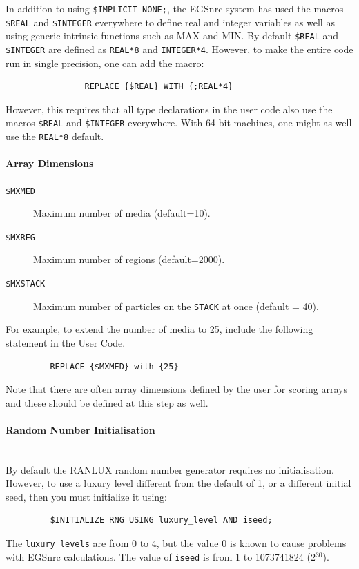 
In addition to using {\tt \$IMPLICIT NONE;}, the EGSnrc system has used
the macros {\tt \$REAL} and {\tt \$INTEGER} everywhere to define real
and integer variables as well as using generic intrinsic functions such
as MAX and MIN.  By default {\tt \$REAL} and {\tt \$INTEGER} are defined
as {\tt REAL*8} and {\tt INTEGER*4}.  However, to make the entire code
run in single precision, one can add the macro:
\begin{verbatim}
                REPLACE {$REAL} WITH {;REAL*4}
\end{verbatim}
However, this requires that all type declarations in the user code also use
the macros {\tt \$REAL} and {\tt \$INTEGER} everywhere.  With 64 bit
machines, one might as well use the {\tt REAL*8} default.

\paragraph{Array Dimensions}
\begin{description}
\item[{\tt \$MXMED}]   Maximum number of media (default=10).
\item[{\tt \$MXREG}]   Maximum number of regions (default=2000).
\item[{\tt \$MXSTACK}]  Maximum number of particles on the {\tt STACK} at once
(default = 40).
\end{description}
For example, to extend the number of media to 25, include the following
statement in the User Code.
\begin{verbatim}
         REPLACE {$MXMED} with {25}
\end{verbatim}
Note that there are often array dimensions defined by the user for scoring
arrays and these should be defined at this step as well.

\paragraph{Random Number Initialisation}
\label{rng_init}

  
 
\mbox{}\\
By default the RANLUX random number generator requires no
initialisation. However, to use a luxury level different from the default
of 1,  or a different initial seed, then you must initialize it using:
\begin{verbatim}
         $INITIALIZE RNG USING luxury_level AND iseed;
\end{verbatim}
The {\tt luxury levels} are from 0 to 4, but the value 0 is known to cause
problems with EGSnrc calculations. The value of {\tt iseed} is from 1 to
1073741824 (2$^{30}$).

